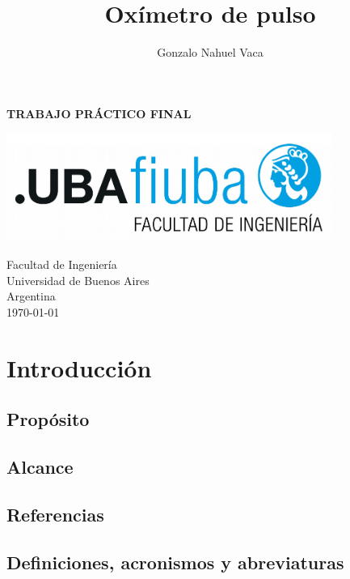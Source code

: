 \documentclass[
    11pt,
    spanish,
	a4paper
]{article}
\title{Oxímetro de pulso}
\author{Gonzalo Nahuel Vaca}
\def\doctype{TRABAJO PRÁCTICO FINAL}
\begin{document}
\makeatletter
\begin{titlepage}
	\begin{center}
		\vspace*{1cm}
		
		\Huge
		\textbf{\doctype}
		
		\vspace{0.5cm}
		\LARGE
		\@title
		
		\vspace{1.5cm}
		
		\textbf{\@author}

		\vspace{3.5cm}

		\includegraphics[width=0.8\textwidth]{img/logoFIUBA.pdf}
		
		\vfill
		Facultad de Ingeniería\\
		Universidad de Buenos Aires\\
		Argentina\\
		\today
	\end{center}
\end{titlepage}
\makeatother
\newpage

\section{Introducción}
\label{sec:introduccion}

\subsection{Propósito}
\label{subsec:proposito}

\subsection{Alcance}
\label{subsec:alcance}

\subsection{Referencias}
\label{subsec:referencias}

\subsection{Definiciones, acronismos y abreviaturas}
\label{subsec:definiciones}
\end{document}
